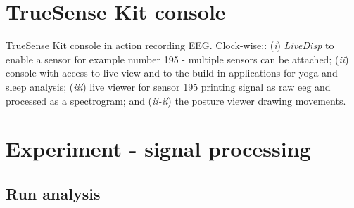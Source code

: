 \documentclass[a4paper,10pt,english,lof,lot,twoside]{puthesis}
\begin{document}
\chapter{TrueSense Kit console}
\label{appendix_background_truesense_console:appendix-background-truesense-console}\label{appendix_background_truesense_console:truesense-kit-console}
TrueSense Kit console in action recording EEG. Clock-wise:: (\emph{i})
\emph{LiveDisp} to enable a sensor for example number 195 - multiple
sensors can be attached; (\emph{ii}) console with access to live view and
to the build in applications for yoga and sleep analysis; (\emph{iii}) live
viewer for sensor 195 printing signal as raw eeg and processed as a
spectrogram; and (\emph{ii-ii}) the posture viewer drawing movements.

{\hfill}
\label{appendix_experiment::doc}

\chapter{Experiment - signal processing}
\label{appendix_experiment:experiment-signal-processing}\label{appendix_experiment:appendix-experiment}

\section{Run analysis}
\label{appendix_experiment:run-analysis}
\end{document}
